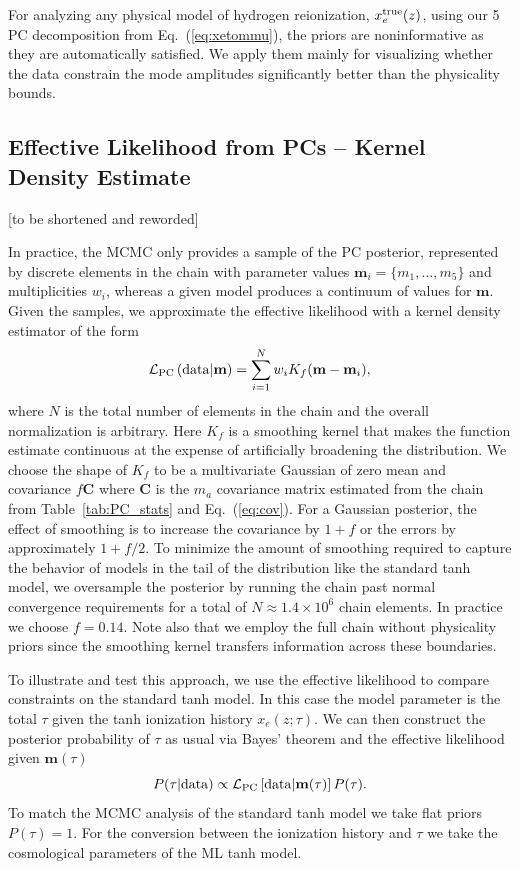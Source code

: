 \documentclass[prd,twocolumn,amsmath,amssymb,floatfix,superscriptaddress,nofootinbib]{revtex4-1}
\newcommand{\beq}{\begin{equation}}
\newcommand{\eeq}{\end{equation}}
\begin{document}
For analyzing any physical model  of hydrogen reionization, $x_e^{\rm true}(z)$, using our 5 PC decomposition from
Eq.~(\ref{eq:xetommu}), the priors are noninformative
as they are automatically satisfied.  We apply them mainly for visualizing whether the data 
 constrain the mode amplitudes significantly better than the physicality bounds.



\subsection{Effective Likelihood from PCs -- Kernel Density Estimate}

[to be shortened and reworded]

In practice, the MCMC only provides a sample of the PC posterior, represented by
discrete elements in the chain with parameter values $\mathbf{m}_i = \{m_1, \ldots, m_5\}$
and multiplicities $w_i$,
whereas a given model produces a continuum of values for $\mathbf{m}$.   
Given the samples, we approximate the effective likelihood with a kernel
density estimator of the form 
\beq
{\cal L}_{\rm PC}\left({\rm data}|\mathbf{m} \right)  = \sum_{i = 1}^{N} w_i K_f(\mathbf{m}-\mathbf{m}_i),
\eeq
where $N$ is the total number of elements in the chain and the overall normalization is arbitrary. Here $K_f$ is a smoothing kernel that
makes the function estimate continuous at the expense of artificially broadening the distribution.
We choose the shape of $K_f$ to be a multivariate Gaussian of zero mean and 
covariance $f\mathbf{C}$ where $\mathbf{C}$ is the $m_a$ 
covariance matrix estimated from the
chain from Table~\ref{tab:PC_stats} and Eq.~(\ref{eq:cov}).    For a Gaussian posterior, the effect of smoothing
is to increase the covariance by $1+f$ or the errors by approximately $1+f/2$.   
To minimize the amount of smoothing required to capture the behavior of models
in the tail of the distribution like the standard tanh model, we oversample the posterior by running  the 
chain past normal convergence requirements for a total of $N\approx 1.4 \times 10^6$ chain elements.
In practice we choose $f=0.14$.  Note also that we employ the full chain without physicality priors since the smoothing kernel transfers information across these boundaries.

To illustrate and test this approach, we  use the effective likelihood to compare constraints on
the 
standard tanh model. In this case the model parameter is the total $\tau$ 
given the tanh ionization history $x_e(z; \tau)$.   We can then construct the posterior probability of
$\tau$ as usual via Bayes' theorem and the effective likelihood given $\mathbf{m}(\tau)$
\begin{equation}
P(\tau| {\rm data}) \propto {\cal L}_{\rm PC}\left[ {\rm data}|\mathbf{m}(\tau) \right] P(\tau).
\end{equation}
To match the MCMC analysis of the standard tanh model we take flat priors $P(\tau)=1$.   
For the conversion between the ionization history and $\tau$ we take the cosmological parameters
of the ML tanh model.  
\end{document}

